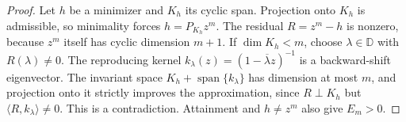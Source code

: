\begin{proof}
Let $h$ be a minimizer and $K_h$ its cyclic span. Projection onto $K_h$
is admissible, so minimality forces $h=P_{K_h}z^m$. The residual
$R=z^m-h$ is nonzero, because $z^m$ itself has cyclic dimension $m+1$.
If $\dim K_h<m$, choose $\lambda\in\mathbb D$ with $R(\lambda)\ne0$.
The reproducing kernel $k_\lambda(z)=(1-\overline\lambda z)^{-1}$ is
a backward-shift eigenvector. The invariant space
$K_h+\operatorname{span}\{k_\lambda\}$ has dimension at most $m$,
and projection onto it strictly improves the approximation, since
$R\perp K_h$ but $\langle R,k_\lambda\rangle\ne0$. This is a
contradiction. Attainment and $h\ne z^m$ also give $E_m>0$.
\end{proof}
